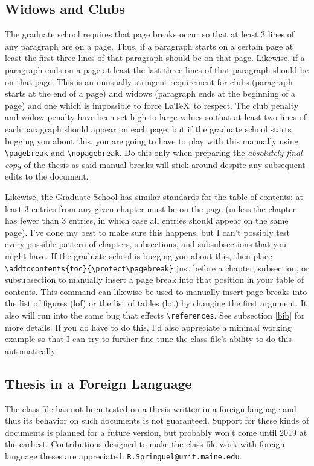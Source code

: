 \subsection{Widows and Clubs}
The graduate school requires that page breaks occur so that at least 3 lines of any paragraph are on a page.  Thus, if a paragraph starts on a certain page at least the first three lines of that paragraph should be on that page.  Likewise, if a paragraph ends on a page at least the last three lines of that paragraph should be on that page.  This is an unusually stringent requirement for clubs (paragraph starts at the end of a page) and widows (paragraph ends at the beginning of a page) and one which is impossible to force \LaTeX\ to respect.  The club penalty and widow penalty have been set high to large values so that at least two lines of each paragraph should appear on each page, but if the graduate school starts bugging you about this, you are going to have to play with this manually using \verb=\pagebreak= and \verb=\nopagebreak=.  Do this only when preparing the \textit{absolutely final copy} of the thesis as said manual breaks will stick around despite any subsequent edits to the document.

Likewise, the Graduate School has similar standards for the table of contents: at least 3 entries from any given chapter must be on the page (unless the chapter has fewer than 3 entries, in which case all entries should appear on the same page).  I've done my best to make sure this happens, but I can't possibly test every possible pattern of chapters, subsections, and subsubsections that you might have.  If the graduate school is bugging you about this, then place \verb=\addtocontents{toc}{\protect\pagebreak}= just before a chapter, subsection, or subsubsection to manually insert a page break into that position in your table of contents.  This command can likewise be used to manually insert page breaks into the list of figures (lof) or the list of tables (lot) by changing the first argument.  It also will run into the same bug that effects \verb=\references=.  See subsection \ref{bib} for more details.  If you do have to do this, I'd also appreciate a minimal working example so that I can try to further fine tune the class file's ability to do this automatically.

\subsection{Thesis in a Foreign Language}
The class file has not been tested on a thesis written in a foreign language and thus its behavior on such documents is not guaranteed.  Support for these kinds of documents is planned for a future version, but probably won't come until 2019 at the earliest.  Contributions designed to make the class file work with foreign language theses are appreciated: \verb=R.Springuel@umit.maine.edu=.


